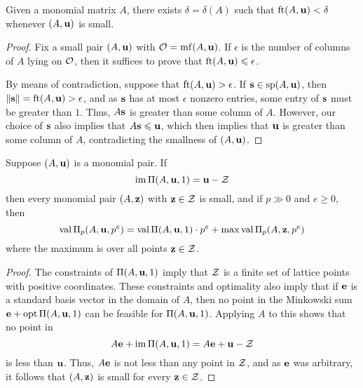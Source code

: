 \documentclass[11pt]{amsart}
\begin{document}
{\color{red}
\begin{lemma}
\label{refined-discreteness: L}
Given a monomial matrix $A$, there exists $\delta = \delta(A)$ such that $\operatorname{ft}(A, \mathbf{u}) < \delta$ whenever $(A, \mathbf{u})$ is small.
\end{lemma}

\begin{proof}   Fix a small pair $(A, \mathbf{u})$ with $\mathcal{O} = \operatorname{mf}(A, \mathbf{u})$.  If $\epsilon$ is the number of columns of $A$ lying on $\mathcal{O}$, then it suffices to prove that $\operatorname{ft}(A, \mathbf{u}) \leqslant \epsilon$.

By means of contradiction, suppose that $\operatorname{ft}(A, \mathbf{u}) > \epsilon$.  If $\mathbf{s} \in \operatorname{sp}(A,\mathbf{u})$, then $\| \mathbf{s} \| = \operatorname{ft}(A, \mathbf{u}) > \epsilon$, and as $\mathbf{s}$ has at most $\epsilon$ nonzero entries, some entry of $\mathbf{s}$ must be greater than $1$.  Thus, $A \mathbf{s}$ is greater than some column of $A$.  However, our choice of $\mathbf{s}$ also implies that $A \mathbf{s} \leqslant \mathbf{u}$, which then implies that $\mathbf{u}$ is greater than some column of $A$, contradicting the smallness of $(A, \mathbf{u})$.
\end{proof}


\begin{proposition}
   \label{follow-leftovers: P}
   Suppose $(A, \mathbf{u})$ is a monomial pair.
   If
   \[ \operatorname{im} \Pi(A, \mathbf{u}, 1) = \mathbf{u} - \mathcal{Z}\]
   then every monomial pair $(A, \mathbf{z})$ with $\mathbf{z} \in \mathcal{Z}$ is small, and if $p \gg 0$  and $e \geq 0$, then
   \[ \operatorname{val} \Pi_p(A, \mathbf{u}, p^e) = \operatorname{val} \Pi(A, \mathbf{u}, 1) \cdot p^e + \max \operatorname{val} \Pi_p(A, \mathbf{z}, p^e) \]
   where the maximum is over all points $\mathbf{z} \in \mathcal{Z}$.
\end{proposition}


\begin{proof}
   The constraints of $\Pi(A, \mathbf{u}, 1)$ imply that $\mathcal{Z}$ is a finite set of lattice points with positive coordinates.   These constraints and optimality also imply that if $\mathbf{e}$ is a standard basis vector in the domain of $A$, then no point in the Minkowski sum $\mathbf{e} + \operatorname{opt} \Pi(A, \mathbf{u}, 1)$ can be feasible for $\Pi(A, \mathbf{u}, 1)$.  Applying $A$ to this shows that no point in
\[ A \mathbf{e} + \operatorname{im} \Pi(A, \mathbf{u}, 1) = A \mathbf{e} + \mathbf{u} - \mathcal{Z} \]
is less than $\mathbf{u}$.  Thus, $A \mathbf{e}$ is not less than any point in $\mathcal{Z}$, and as $\mathbf{e}$ was arbitrary, it follows that $(A, \mathbf{z})$ is small for every $\mathbf{z} \in \mathcal{Z}$.


\end{proof}}
\end{document}
